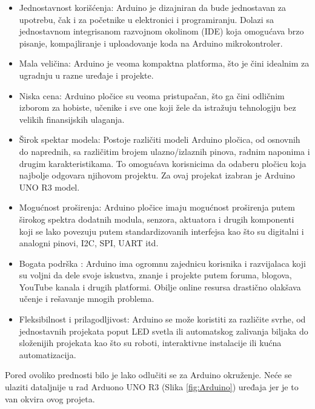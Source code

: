 \documentclass[a4paper, 12pt]{article}
\begin{document}
	\begin{itemize}
	
		\item Jednostavnost korišćenja: Arduino je dizajniran da bude jednostavan za upotrebu, čak i za početnike u elektronici i programiranju. Dolazi sa jednostavnom integrisanom razvojnom okolinom (IDE) koja omogućava brzo pisanje, kompajliranje i uploadovanje koda na Arduino mikrokontroler.
		\item Mala veličina: Arduino je veoma kompaktna platforma, što je čini idealnim za ugradnju u razne uređaje i projekte.
		\sloppypar
        \item Niska cena: Arduino pločice su veoma pristupačan, što ga čini odličnim izborom za hobiste, učenike i sve one koji žele da istražuju tehnologiju bez velikih finansijskih ulaganja.
        \item Širok spektar modela: Postoje različiti modeli Arduino pločica, od osnovnih do naprednih, sa različitim brojem ulazno/izlaznih pinova, radnim naponima i drugim karakteristikama. To omogućava korisnicima da odaberu pločicu koja najbolje odgovara njihovom projektu. Za ovaj projekat izabran je Arduino UNO R3 model.
        \item Mogućnost proširenja: Arduino pločice imaju mogućnost proširenja putem širokog spektra dodatnih modula, senzora, aktuatora i drugih komponenti koji se lako povezuju putem standardizovanih interfejsa kao što su digitalni i analogni pinovi, I2C, SPI, UART itd.
        \item Bogata podrška : Arduino ima ogromnu zajednicu korisnika i razvijalaca koji su voljni da dele svoje iskustva, znanje i projekte putem foruma, blogova, YouTube kanala i drugih platformi. Obilje  online resursa drastično olakšava učenje i rešavanje mnogih problema.
        \item Fleksibilnost i prilagodljivost: Arduino se može koristiti za različite svrhe, od jednostavnih projekata poput LED svetla ili automatskog zalivanja biljaka do složenijih projekata kao što su roboti, interaktivne instalacije ili kućna automatizacija. 
       
	\end{itemize}

\vspace{10pt}

\sloppypar
Pored ovoliko prednosti bilo je lako odlučiti se za Arduino okruženje. Neće se ulaziti dataljnije u rad Arduono UNO R3 (Slika \ref{fig:Arduino}) uređaja jer je to van okvira ovog projeta. 
\end{document}
